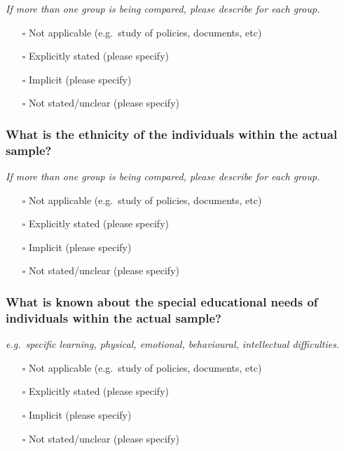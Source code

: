 \documentclass[
  doc, a4paper]{apa7}
\providecommand{\tightlist}{%
  \setlength{\itemsep}{0pt}\setlength{\parskip}{0pt}}
\begin{document}
\emph{If more than one group is being compared, please describe for each group.}

\begin{itemize}
\tightlist
\item[$\square$]
  Not applicable (e.g.~study of policies, documents, etc)
\item[$\square$]
  Explicitly stated (please specify)
\item[$\square$]
  Implicit (please specify)
\item[$\square$]
  Not stated/unclear (please specify)
\end{itemize}

\subsubsection{What is the ethnicity of the individuals within the actual sample?}\label{what-is-the-ethnicity-of-the-individuals-within-the-actual-sample}

\emph{If more than one group is being compared, please describe for each group.}

\begin{itemize}
\tightlist
\item[$\square$]
  Not applicable (e.g.~study of policies, documents, etc)
\item[$\square$]
  Explicitly stated (please specify)
\item[$\square$]
  Implicit (please specify)
\item[$\square$]
  Not stated/unclear (please specify)
\end{itemize}

\subsubsection{What is known about the special educational needs of individuals within the actual sample?}\label{what-is-known-about-the-special-educational-needs-of-individuals-within-the-actual-sample}

\emph{e.g.~specific learning, physical, emotional, behavioural, intellectual difficulties.}

\begin{itemize}
\tightlist
\item[$\square$]
  Not applicable (e.g.~study of policies, documents, etc)
\item[$\square$]
  Explicitly stated (please specify)
\item[$\square$]
  Implicit (please specify)
\item[$\square$]
  Not stated/unclear (please specify)
\end{itemize}
\end{document}
